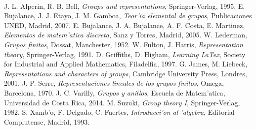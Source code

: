 \documentclass[a4paper,openright,12pt]{book}
\numberwithin{equation}{section} %
\begin{document}
\newpage
$\ $
\thispagestyle{empty}
\begin{thebibliography}{9}
 J. L. Alperin, R. B. Bell, \emph{Groups and representations}, Springer-Verlag, 1995.
 E. Bujalance, J. J. Etayo, J. M. Gamboa, \emph{Teor'ia elemental de grupos}, Publicaciones UNED, Madrid, 2007.
 E. Bujalance, J. A. Bujalance, A. F. Costa, E. Martinez, \emph{Elementos de matem'atica discreta}, Sanz y Torres, Madrid, 2005.
 W. Lederman, \emph{Grupos finitos}, Dossat, Manchester, 1952.
 W. Fulton, J. Harris, \emph{Representation theory}, Springer-Verlag, 1991.
 D. Griffiths, D. Higham, \emph{Learning LaTex}, Society for Industrial and Applied Mathematics, Filadelfia, 1997.
 G. James, M. Liebeck, \emph{Representations and characters of groups}, Cambridge University Press, Londres, 2001.
 J. P. Serre, \emph{Representaciones lineales de los grupos finitos}, Omega, Barcelona, 1970.
 J. C. Varilly, \emph{Grupos y anillos}, Escuela de Matem'atica, Universidad de Costa Rica, 2014. 
 M. Suzuki, \emph{Group theory I}, Springer-Verlag, 1982. 
 S. Xamb'o, F. Delgado, C. Fuertes, \emph{Introducci'on al 'algebra}, Editorial Complutense, Madrid, 1993.
\end{thebibliography}
\end{document}
